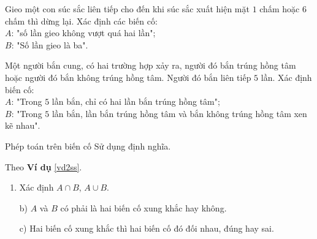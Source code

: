 \begin{bt}%
	Gieo một con súc sắc liên tiếp cho đến khi súc sắc xuất hiện mặt $1$ chấm hoặc $6$ chấm thì dừng lại. Xác định các biến cố:\\
	\indent $A$: "số lần gieo không vượt quá hai lần";\\
	\indent $B$: "Số lần gieo là ba".
\end{bt}
\begin{bt}%
	Một người bắn cung, có hai trường hợp xảy ra, người đó bắn trúng hồng tâm hoặc người đó bắn không trúng hồng tâm. Người đó bắn liên tiếp $5$ lần. Xác định biến cố:\\
	\indent $A$: "Trong $5$ lần bắn, chỉ có hai lần bắn trúng hồng tâm";\\
	\indent $B$: "Trong $5$ lần bắn, lần bắn trúng hồng tâm và bắn không trúng hồng tâm xen kẽ nhau".
\end{bt}

\begin{dang}{Phép toán trên biến cố}
	Sử dụng định nghĩa.
\end{dang}
\begin{vd}%
	Theo \textbf{Ví dụ} \ref{vd2ss}.
	\begin{enumerate}
		\item Xác định $A \cap B$, $A \cup B$.
		\item[b)] $A$ và $B$ có phải là hai biến cố xung khắc hay không.
		\item[c)] Hai biến cố xung khắc thì hai biến cố đó đối nhau, đúng hay sai.
	\end{enumerate}
\end{vd}

